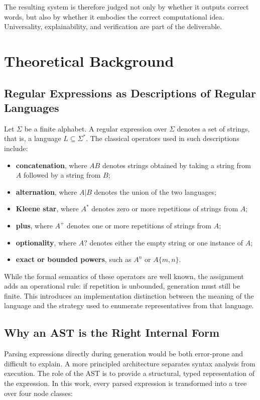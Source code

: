 \documentclass[a4paper,12pt]{article}
\begin{document}
The resulting system is therefore judged not only by whether it outputs correct words, but also by whether it embodies the correct computational idea. Universality, explainability, and verification are part of the deliverable.

\section{Theoretical Background}

\subsection{Regular Expressions as Descriptions of Regular Languages}

Let $\Sigma$ be a finite alphabet. A regular expression over $\Sigma$ denotes a set of strings, that is, a language $L \subseteq \Sigma^*$. The classical operators used in such descriptions include:

\begin{itemize}
    \item \textbf{concatenation}, where $AB$ denotes strings obtained by taking a string from $A$ followed by a string from $B$;
    \item \textbf{alternation}, where $A|B$ denotes the union of the two languages;
    \item \textbf{Kleene star}, where $A^*$ denotes zero or more repetitions of strings from $A$;
    \item \textbf{plus}, where $A^+$ denotes one or more repetitions of strings from $A$;
    \item \textbf{optionality}, where $A?$ denotes either the empty string or one instance of $A$;
    \item \textbf{exact or bounded powers}, such as $A^n$ or $A\{m,n\}$.
\end{itemize}

While the formal semantics of these operators are well known, the assignment adds an operational rule: if repetition is unbounded, generation must still be finite. This introduces an implementation distinction between the meaning of the language and the strategy used to enumerate representatives from that language.

\subsection{Why an AST is the Right Internal Form}

Parsing expressions directly during generation would be both error-prone and difficult to explain. A more principled architecture separates syntax analysis from execution. The role of the AST is to provide a structural, typed representation of the expression. In this work, every parsed expression is transformed into a tree over four node classes:
\end{document}
